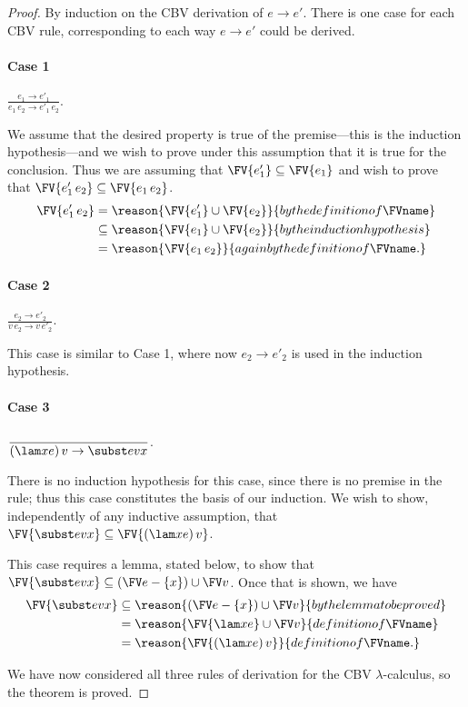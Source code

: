 \begin{proof}
By induction on the CBV derivation of $e\rightarrow e'$. There is one case for each CBV rule, corresponding to each way $e\rightarrow e'$ could be derived.

\paragraph{Case 1}
$\displaystyle\frac{e_1\rightarrow e'_1}{e_1\,e_2\rightarrow e'_1\,e_2}$.

We assume that the desired property is true of the premise---this is the induction hypothesis---and we wish to prove under this assumption that it is true for the conclusion. Thus we are assuming that $\FV{e'_1}\subseteq\FV{e_1}$ and wish to prove that $\FV{e'_1\,e_2}\subseteq\FV{e_1\,e_2}$.
\begin{align*}
\FV{e'_1\,e_2} &= \reason{\FV{e'_1}\cup\FV{e_2}}{by the definition of \FVname}\\
&\subseteq \reason{\FV{e_1}\cup\FV{e_2}}{by the induction hypothesis}\\
&= \reason{\FV{e_1\,e_2}}{again by the definition of \FVname.}
\end{align*}

\paragraph{Case 2}
$\displaystyle\frac{e_2\rightarrow e'_2}{v\,e_2\rightarrow v\,e'_2}$.

This case is similar to Case 1, where now $e_2\rightarrow e'_2$ is used in the induction hypothesis.

\paragraph{Case 3}
$\displaystyle\frac{}{(\lam xe)\,v\rightarrow\subst evx}$.

There is no induction hypothesis for this case, since there is no premise in the rule; thus this case constitutes the basis of our induction. We wish to show, independently of any inductive assumption, that $\FV{\subst evx}\subseteq\FV{(\lam xe)\,v}$.

This case requires a lemma, stated below, to show that $\FV{\subst evx} \subseteq (\FV e - \{x\}) \cup \FV v$. Once that is shown, we have
\begin{align*}
\FV{\subst evx} &\subseteq \reason{(\FV e - \{x\})\cup\FV v}{by the lemma to be proved}\\
&= \reason{\FV{\lam xe} \cup \FV v}{definition of \FVname}\\
&= \reason{\FV{(\lam xe)\,v}}{definition of \FVname.}
\end{align*}

We have now considered all three rules of derivation for the CBV $\lambda$-calculus, so the theorem is proved.
\end{proof}

